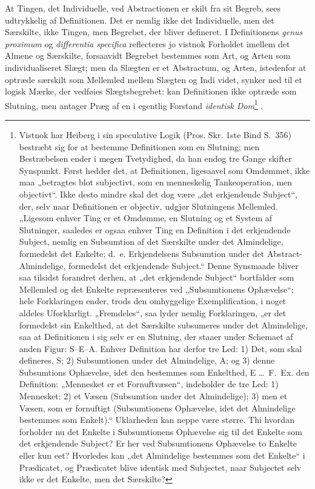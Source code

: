\documentclass[12pt]{book}
\newcommand{\opage}[1]{\marginnote{\footnotesize\textit{[#1]}}}
\begin{document}
At Tingen, det Individuelle, ved Abstractionen er skilt fra sit Begreb, sees udtrykkelig af Definitionen. Det er nemlig ikke det Individuelle, men det Særskilte, ikke Tingen, men Begrebet, der bliver defineret. I Definitionens \textit{genus proximum} og \textit{differentia specifica} reflecteres jo vistnok Forholdet imellem det Almene og Særskilte, forsaavidt Begrebet bestemmes som Art, og Arten som individualiseret Slægt; men da Slægten er et Abstractum, og Arten, istedenfor at optræde særskilt som Mellemled mellem Slægten og Indi%
\opage{373}videt, synker ned til et logisk Mærke, der vedføies Slægtsbegrebet: kan Definitionen ikke optræde som Slutning, men antager Præg af en i egentlig Forstand \emph{identisk Dom}\footnote{Vistnok har Heiberg i sin speculative Logik (Pros. Skr. 1ste Bind S.~356) bestræbt sig for at bestemme Definitionen som en Slutning; men Bestræbelsen ender i megen Tvetydighed, da han endog tre Gange skifter Synspunkt. Først hedder det, at Definitionen, ligesaavel som Omdømmet, ikke maa „betragtes blot subjectivt, som en menneskelig Tankeoperation, men objectivt“. Ikke desto mindre skal det dog være „det erkjendende Subject“, der, selv naar Definitionen er objectiv, udgjør Slutningens Mellemled. „Ligesom enhver Ting er et Omdømme, en Slutning og et System af Slutninger, saaledes er ogsaa enhver Ting en Definition i det erkjendende Subject, nemlig en Subsumtion af det Særskilte under det Almindelige, formedelst det Enkelte; d.~e. Erkjendelsens Subsumtion under det Abstract-Almindelige, formedelst det erkjendende Subject.“ Denne Synsmaade bliver saa tilsidst forandret derhen, at „det erkjendende Subject“ bortfalder som Mellemled og det Enkelte repræsenteres ved „Subsumtionens Ophævelse“; hele Forklaringen ender, trods den omhyggelige Exemplification, i noget aldeles Uforklarligt. „Fremdeles“, saa lyder nemlig Forklaringen, „er det formedelst sin Enkelthed, at det Særskilte subsumeres under det Almindelige, saa at Definitionen i sig selv er en Slutning, der staaer under Schemaet af anden Figur: S--E--A. Enhver Definition har derfor tre Led: 1) Det, som skal defineres, S; 2) Subsumtionen under det Almindelige, A; og 3) denne Subsumtions Ophævelse, idet den bestemmes som Enkelthed, E \dots\ F.~Ex. den Definition: „Mennesket er et Fornuftvæsen“, indeholder de tre Led: 1) Mennesket: 2) et Væsen (Subsumtion under det Almindelige); 3) men et Væsen, som er fornuftigt (Subsumtionens Ophævelse, idet det Almindelige bestemmes som Enkelt).“ Uklarheden kan neppe være større. Thi hvordan forholder nu det Enkelte i Subsumtionens Ophævelse sig til det Enkelte som det erkjendende Subject? Er her ved Subsumtionens Ophævelse to Enkelte eller kun eet? Hvorledes kan „det Almindelige bestemmes som det Enkelte“ i Prædicatet, og Prædicatet blive identisk med Subjectet, naar Subjectet selv ikke er det Enkelte, men det Særskilte?}%
.
\end{document}
